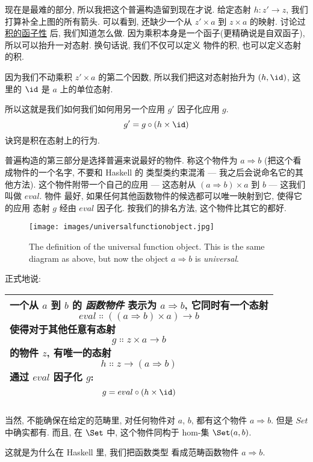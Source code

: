 \noindent
现在是最难的部分, 所以我把这个普遍构造留到现在才说. 给定态射 $h\colon{}z'\to{}z$, 我们打算补全上图的所有箭头.
可以看到, 还缺少一个从 $z'\times{}a$ 到 $z\times{}a$ 的映射. 讨论过 \hyperref[functoriality]{积的函子性}
后, 我们知道怎么做. 因为乘积本身是一个函子(更精确说是自双函子), 所以可以抬升一对态射. 换句话说, 我们不仅可以定义
物件的积, 也可以定义态射的积.

因为我们不动乘积 $z'\times{}a$ 的第二个因数, 所以我们把这对态射抬升为 $(h, \id)$, 这里的 $\id$ 是 $a$ 上的单位态射.

所以这就是我们如何我们如何用另一个应用 $g'$ 因子化应用 $g$.
\[g' = g \circ (h \times \id)\]
诀窍是积在态射上的行为.

普遍构造的第三部分是选择普遍来说最好的物件. 称这个物件为 $a \Rightarrow b$ (把这个看成物件的一个名字, 不要和 Haskell 的
类型类约束混淆 --- 我之后会说命名它的其他方法). 这个物件附带一个自己的应用 --- 这态射从 $(a \Rightarrow b) \times a$ 到 $b$
 --- 这我们叫做 $eval$. 物件  最好, 如果任何其他函数物件的候选都可以唯一映射到它, 使得它的应用
 态射 $g$ 经由 $eval$ 因子化. 按我们的排名方法, 这个物件比其它的都好.

\begin{figure}[H]
  \centering
  \texttt{[image: images/universalfunctionobject.jpg]}
  \caption{The definition of the universal function object. This is the same
    diagram as above, but now the object $a \Rightarrow b$ is \emph{universal}.}
\end{figure}

\noindent
正式地说:

\begin{longtable}[]{@{}l@{}}
  \toprule
  \begin{minipage}[t]{0.97\columnwidth}\raggedright\strut
    一个从 $a$ 到 $b$ 的 \emph{函数物件} 表示为 $a \Rightarrow b$, 它同时有一个态射
    \[eval \Colon ((a \Rightarrow b) \times a) \to b\]
    使得对于其他任意有态射
    \[g \Colon z \times a \to b\] 的物件 $z$,
    有唯一的态射
    \[h \Colon z \to (a \Rightarrow b)\]
    通过 $eval$ 因子化 $g$:
    \[g = eval \circ (h \times \id)\]
  \end{minipage}\tabularnewline
  \bottomrule
\end{longtable}

\noindent
当然, 不能确保在给定的范畴里, 对任何物件对 $a$, $b$, 都有这个物件 $a \Rightarrow b$. 但是 $Set$ 中确实都有.
而且, 在 $\Set$ 中, 这个物件同构于 hom-集 $\Set(a, b)$.

这就是为什么在 Haskell 里, 我们把函数类型  看成范畴函数物件 $a \Rightarrow b$.

